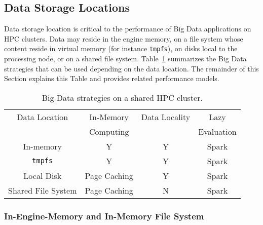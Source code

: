 \documentclass{IEEEtran}
\begin{document}

\subsection{Data Storage Locations}

Data storage location is critical to the performance of Big Data 
applications on HPC clusters. Data may reside in the engine memory, on 
a file system whose content reside in virtual memory (for instance 
\texttt{tmpfs}), on disks local to the processing node, or on a shared 
file system. Table~\ref{table:features} summarizes the Big Data 
strategies that can be used depending on the data location. The 
remainder of this Section explains this Table and provides related 
performance models.
\begin{table}
\centering
\begin{tabular}{c|ccc}
   \rowcolor{headcolor}
    Data Location                 & In-Memory     & Data Locality & Lazy \\
    \rowcolor{headcolor}
                                  & Computing     &               & Evaluation      \\
                                  \hline          
In-memory                         &   Y           & Y             & Spark               \\
\texttt{tmpfs}                    &   Y           & Y             & Spark           \\
Local Disk                        & Page Caching  & Y             & Spark           \\
Shared File System                & Page Caching  & N            & Spark          
\end{tabular}
\caption{Big Data strategies on a shared HPC cluster.}
\label{table:features}
\end{table}

\subsubsection{In-Engine-Memory and In-Memory File System} 
\end{document}
